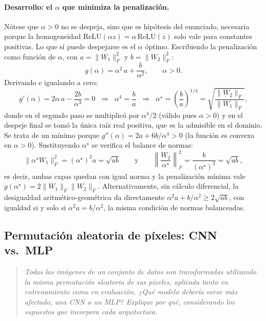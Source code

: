 \documentclass[12pt, a4paper]{article}
\newenvironment{enunciado}
  {\begin{quote}\itshape\color{black!75}}
  {\end{quote}}
\begin{document}
\paragraph{Desarrollo: el $\alpha$ que minimiza la penalización.} Nótese que $\alpha > 0$
no se despeja, sino que es hipótesis del enunciado, necesaria porque la homogeneidad
$\mathrm{ReLU}(\alpha z) = \alpha\,\mathrm{ReLU}(z)$ solo vale para constantes positivas.
Lo que sí puede despejarse es el $\alpha$ óptimo. Escribiendo la penalización como función
de $\alpha$, con $a = \|W_1\|_F^2$ y $b = \|W_2\|_F^2$:
\begin{equation}
g(\alpha) = \alpha^2\,a + \frac{b}{\alpha^2}, \qquad \alpha > 0.
\end{equation}
Derivando e igualando a cero:
\begin{equation}
g'(\alpha) = 2\alpha\,a - \frac{2b}{\alpha^3} = 0
\;\;\Longrightarrow\;\; \alpha^4 = \frac{b}{a}
\;\;\Longrightarrow\;\; \alpha^\star = \left(\frac{b}{a}\right)^{1/4}
= \sqrt{\frac{\|W_2\|_F}{\|W_1\|_F}},
\end{equation}
donde en el segundo paso se multiplicó por $\alpha^3/2$ (válido pues $\alpha > 0$) y en el
despeje final se tomó la única raíz real positiva, que es la admisible en el dominio. Se
trata de un mínimo porque $g''(\alpha) = 2a + 6b/\alpha^4 > 0$ (la función es convexa en
$\alpha > 0$). Sustituyendo $\alpha^\star$ se verifica el balance de normas:
\begin{equation}
\|\alpha^\star W_1\|_F^2 = (\alpha^\star)^2 a = \sqrt{ab}
\qquad\text{y}\qquad
\left\|\frac{W_2}{\alpha^\star}\right\|_F^2 = \frac{b}{(\alpha^\star)^2} = \sqrt{ab},
\end{equation}
es decir, ambas capas quedan con igual norma y la penalización mínima vale
$g(\alpha^\star) = 2\|W_1\|_F\|W_2\|_F$. Alternativamente, sin cálculo diferencial, la
desigualdad aritmético-geométrica da directamente
$\alpha^2 a + b/\alpha^2 \geq 2\sqrt{ab}$, con igualdad si y solo si
$\alpha^2 a = b/\alpha^2$, la misma condición de normas balanceadas.

\subsection{Permutación aleatoria de píxeles: CNN vs.\ MLP}

\begin{enunciado}
Todas las imágenes de un conjunto de datos son transformadas utilizando la misma permutación
aleatoria de sus píxeles, aplicada tanto en entrenamiento como en evaluación. ¿Qué modelo
debería verse más afectado, una CNN o un MLP? Explique por qué, considerando los supuestos
que incorpora cada arquitectura.
\end{enunciado}
\end{document}
